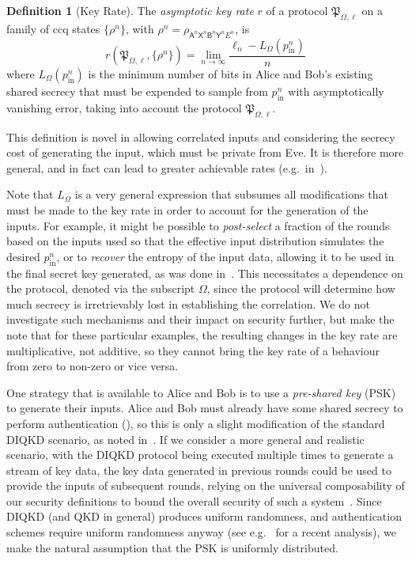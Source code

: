 \documentclass[10pt, a4paper]{article}
\numberwithin{equation}{section} %
\newcounter{stmt} %
\theoremstyle{definition}
\newtheorem{defn}[stmt]{Definition}
\theoremstyle{plain}
\newcommand{\?}{\mathrel{?}} %
\newcommand{\crv}[1]{\mathsf{#1}}
\newcommand{\proto}[2][_{\Omega,\ell}]{\mathfrak{#2}#1}
\newcommand{\prin}[1][p]{#1_{\mathrm{in}}}
\begin{document}
    \begin{defn}[Key Rate]
      The \emph{asymptotic key rate} \(r\) of a protocol \(\proto{P}\) on a family of ccq states \({\{\rho^{n}\}}\), with \(\rho^{n} = \rho_{\crv{A}^n\crv{X}^n \crv{B}^n\crv{Y}^n E^n}\), is
    \begin{equation}
      r(\proto{P}, \{\rho^n\}) = \lim_{n\to\infty} \frac{\ell_n - L_{\Omega}(\prin^n)}{n}
    \end{equation}
    where \(L_{\Omega}(\prin^n)\) is the minimum number of bits in Alice and Bob's existing shared secrecy that must be expended to sample from \(\prin^n\) with asymptotically vanishing error, taking into account the protocol \(\proto{P}\).
  \end{defn}

    This definition is novel in allowing correlated inputs and considering the secrecy cost of generating the input, which must be private from Eve. It is therefore more general, and in fact can lead to greater achievable rates (e.g.\ in~\cite[Prot. 2]{DIQKD_FiniteSize}).

    Note that \(L_{\Omega}\) is a very general expression that subsumes all modifications that must be made to the key rate in order to account for the generation of the inputs. For example, it might be possible to \emph{post-select} a fraction of the rounds based on the inputs used so that the effective input distribution simulates the desired \(\prin^n\), or to \emph{recover} the entropy of the input data, allowing it to be used in the final secret key generated, as was done in~\cite[Prot. 2]{DIQKD_FiniteSize}. This necessitates a dependence on the protocol, denoted via the subscript \(\Omega\), since the protocol will determine how much secrecy is irretrievably lost in establishing the correlation. We do not investigate such mechanisms and their impact on security further, but make the note that for these particular examples, the resulting changes in the key rate are multiplicative, not additive, so they cannot bring the key rate of a behaviour from zero to non-zero or vice versa.

    One strategy that is available to Alice and Bob is to use a \emph{pre-shared key} (PSK) to generate their inputs. Alice and Bob must already have some shared secrecy to perform authentication (), so this is only a slight modification of the standard DIQKD scenario, as noted in~\cite{DIQKD_FiniteSize}. If we consider a more general and realistic scenario, with the DIQKD protocol being executed multiple times to generate a stream of key data, the key data generated in previous rounds could be used to provide the inputs of subsequent rounds, relying on the universal composability of our security definitions to bound the overall security of such a system~\cite{QCryptCompose}. Since DIQKD (and QKD in general) produces uniform randomness, and authentication schemes require uniform randomness anyway (see e.g.~\cite{AuthKeyRecycling} for a recent analysis), we make the natural assumption that the PSK is uniformly distributed.
\end{document}
